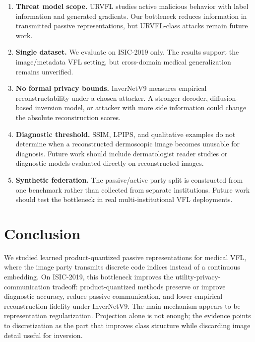 \documentclass{article}
\begin{document}
\begin{enumerate}
    \item \textbf{Threat model scope.} URVFL \citep{yao2025urvfl} studies active malicious behavior with label information and generated gradients. Our bottleneck reduces information in transmitted passive representations, but URVFL-class attacks remain future work.
    \item \textbf{Single dataset.} We evaluate on ISIC-2019 only. The results support the image/metadata VFL setting, but cross-domain medical generalization remains unverified.
    \item \textbf{No formal privacy bounds.} InverNetV9 measures empirical reconstructability under a chosen attacker. A stronger decoder, diffusion-based inversion model, or attacker with more side information could change the absolute reconstruction scores.
    \item \textbf{Diagnostic threshold.} SSIM, LPIPS, and qualitative examples do not determine when a reconstructed dermoscopic image becomes unusable for diagnosis. Future work should include dermatologist reader studies or diagnostic models evaluated directly on reconstructed images.
    \item \textbf{Synthetic federation.} The passive/active party split is constructed from one benchmark rather than collected from separate institutions. Future work should test the bottleneck in real multi-institutional VFL deployments.
\end{enumerate}

\section{Conclusion}
We studied learned product-quantized passive representations for medical VFL, where the image party transmits discrete code indices instead of a continuous embedding. On ISIC-2019, this bottleneck improves the utility-privacy-communication tradeoff: product-quantized methods preserve or improve diagnostic accuracy, reduce passive communication, and lower empirical reconstruction fidelity under InverNetV9. The main mechanism appears to be representation regularization. Projection alone is not enough; the evidence points to discretization as the part that improves class structure while discarding image detail useful for inversion.
\end{document}
